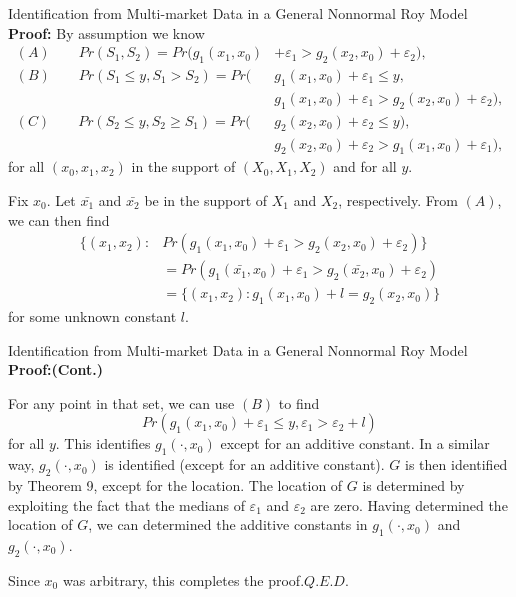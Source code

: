 \documentclass{beamer}
\begin{document}
\begin{frame}{Identification from Multi-market Data in a General Nonnormal Roy Model}
\textbf{Proof:} By assumption we know
	\begin{equation}\nonumber
	\begin{aligned}
	(A)\qquad Pr(S_1,S_2)=Pr(g_1(x_1,x_0)&+\varepsilon_1>g_2(x_2,x_0)+\varepsilon_2),\\
	(B) \qquad Pr(S_1\leq y,S_1>S_2)=Pr(&g_1(x_1,x_0)+\varepsilon_1\leq y,\\
	&g_1(x_1,x_0)+\varepsilon_1>g_2(x_2,x_0)+\varepsilon_2),\\
	(C) \qquad Pr(S_2\leq y,S_2\geq S_1)=Pr(&g_2(x_2,x_0)+\varepsilon_2\leq y),\\
	&g_2(x_2,x_0)+\varepsilon_2>g_1(x_1,x_0)+\varepsilon_1),
	\end{aligned}
	\end{equation}
for all $(x_0,x_1,x_2)$ in the support of $(X_0,X_1,X_2)$ and for all $y$.

Fix $x_0$. Let $\bar{x_1}$ and $\bar{x_2}$ be in the support of $X_1$ and $X_2$, respectively. From $(A)$, we can then find
	\begin{equation}\nonumber
	\begin{aligned}
	\{(x_1,x_2):&Pr(g_1(x_1,x_0)+\varepsilon_1>g_2(x_2,x_0)+\varepsilon_2)\} \\
	&=Pr(g_1(\bar{x_1},x_0)+\varepsilon_1>g_2(\bar{x_2},x_0)+\varepsilon_2)\\
	&=\{(x_1,x_2):g_1(x_1,x_0)+l=g_2(x_2,x_0)\}
	\end{aligned}
	\end{equation}
for some unknown constant $l$.
\end{frame}

\begin{frame}{Identification from Multi-market Data in a General Nonnormal Roy Model}
\textbf{Proof:(Cont.)}

For any point in that set, we can use $(B)$ to find
$$Pr(g_1(x_1,x_0)+\varepsilon_1 \leq y,\varepsilon_1>\varepsilon_2+l)$$
for all $y$. This identifies $g_1(\cdot,x_0)$ except for an additive constant. In a similar way, $g_2(\cdot,x_0)$ is identified (except for an additive constant). $G$ is then identified by Theorem 9, except for the location. The location of $G$ is determined by exploiting the fact that the medians of $\varepsilon_1$ and $\varepsilon_2$ are zero. Having determined the location of $G$, we can determined the additive constants in $g_1(\cdot,x_0)$ and $g_2(\cdot,x_0)$.

\medskip
Since $x_0$ was arbitrary, this completes the proof.\hfill $Q.E.D.$
\end{frame}
\end{document}
